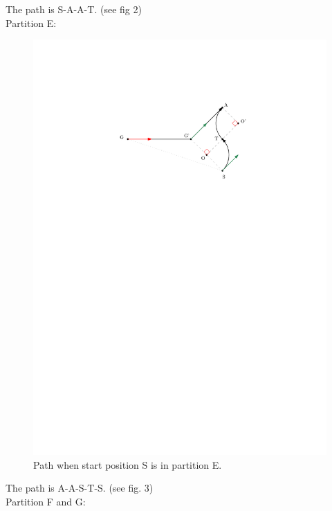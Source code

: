 \documentclass[12pt]{article}
\begin{document}
  The path is S-A-A-T. (see fig 2)\\
  
  Partition E:
  
  \begin{figure}
  \centering
  \includegraphics[scale=1]{Diff_Drive_Gene_Case_2}
  \caption{Path when start position S is in partition E.}
  \end{figure}

  The path is A-A-S-T-S. (see fig. 3)\\

  Partition F and G:
  
\end{document}
